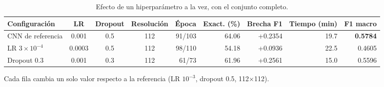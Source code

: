 \begin{table}[htbp]
\centering
\caption{Efecto de un hiperparámetro a la vez, con el conjunto completo.}
\label{tab:hiperparametros}
\small
\begin{tabular}{lcccrrrrr}
\toprule
Configuración & LR & Dropout & Resolución & Época & Exact. (\%) & Brecha F1 & Tiempo (min) & F1 macro \\
\midrule
CNN de referencia & 0.001 & 0.5 & 112 & 91/103 & 64.06 & +0.2354 & 19.7 & \textbf{0.5784} \\
LR $3\times10^{-4}$ & 0.0003 & 0.5 & 112 & 98/110 & 54.18 & +0.0936 & 22.5 & 0.4605 \\
Dropout 0.3 & 0.001 & 0.3 & 112 & 61/73 & 61.96 & +0.2561 & 15.0 & 0.5596 \\
\bottomrule
\end{tabular}
\par\smallskip
\parbox{0.95\textwidth}{\footnotesize Cada fila cambia un solo valor respecto a la referencia (LR $10^{-3}$, dropout 0.5, 112$\times$112).}
\end{table}
